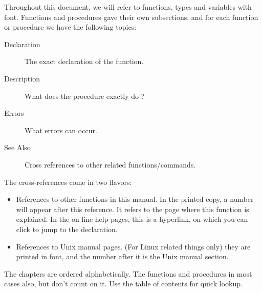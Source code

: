 Throughout this document, we will refer to functions, types and variables
with  font. Functions and procedures gave their own
subsections, and for each function or procedure we have the following
topics:
\begin{description}
\item [Declaration] The exact declaration of the function.
\item [Description] What does the procedure exactly do ?
\item [Errors] What errors can occur.
\item [See Also] Cross references to other related functions/commands.
\end{description}
The cross-references come in two flavors:
\begin{itemize}
\item References to other functions in this manual. In the printed copy, a
number will appear after this reference. It refers to the page where this
function is explained. In the on-line help pages, this is a hyperlink, on
which you can click to jump to the declaration.
\item References to Unix manual pages. (For Linux related things only) they
are printed in  font, and the number after it is the Unix
manual section.
\end{itemize}
The chapters are ordered alphabetically. The functions and procedures in
most cases also, but don't count on it. Use the table of contents for quick
lookup.

%
%
























\printindex
